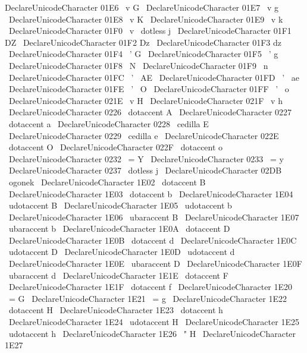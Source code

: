 {{{{{DeclareUnicodeCharacter
{
01E6
}
{
\
v
{
G
}
}
\
DeclareUnicodeCharacter
{
01E7
}
{
\
v
{
g
}
}
\
DeclareUnicodeCharacter
{
01E8
}
{
\
v
{
K
}
}
\
DeclareUnicodeCharacter
{
01E9
}
{
\
v
{
k
}
}
\
DeclareUnicodeCharacter
{
01F0
}
{
\
v
{
\
dotless
{
j
}
}
}
\
DeclareUnicodeCharacter
{
01F1
}
{
DZ
}
\
DeclareUnicodeCharacter
{
01F2
}
{
Dz
}
\
DeclareUnicodeCharacter
{
01F3
}
{
dz
}
\
DeclareUnicodeCharacter
{
01F4
}
{
\
'
G
}
\
DeclareUnicodeCharacter
{
01F5
}
{
\
'
g
}
\
DeclareUnicodeCharacter
{
01F8
}
{
\
N
}
\
DeclareUnicodeCharacter
{
01F9
}
{
\
n
}
\
DeclareUnicodeCharacter
{
01FC
}
{
\
'
{
\
AE
}
}
\
DeclareUnicodeCharacter
{
01FD
}
{
\
'
{
\
ae
}
}
\
DeclareUnicodeCharacter
{
01FE
}
{
\
'
{
\
O
}
}
\
DeclareUnicodeCharacter
{
01FF
}
{
\
'
{
\
o
}
}
\
DeclareUnicodeCharacter
{
021E
}
{
\
v
{
H
}
}
\
DeclareUnicodeCharacter
{
021F
}
{
\
v
{
h
}
}
\
DeclareUnicodeCharacter
{
0226
}
{
\
dotaccent
{
A
}
}
\
DeclareUnicodeCharacter
{
0227
}
{
\
dotaccent
{
a
}
}
\
DeclareUnicodeCharacter
{
0228
}
{
\
cedilla
{
E
}
}
\
DeclareUnicodeCharacter
{
0229
}
{
\
cedilla
{
e
}
}
\
DeclareUnicodeCharacter
{
022E
}
{
\
dotaccent
{
O
}
}
\
DeclareUnicodeCharacter
{
022F
}
{
\
dotaccent
{
o
}
}
\
DeclareUnicodeCharacter
{
0232
}
{
\
=
Y
}
\
DeclareUnicodeCharacter
{
0233
}
{
\
=
y
}
\
DeclareUnicodeCharacter
{
0237
}
{
\
dotless
{
j
}
}
\
DeclareUnicodeCharacter
{
02DB
}
{
\
ogonek
{
}
}
\
DeclareUnicodeCharacter
{
1E02
}
{
\
dotaccent
{
B
}
}
\
DeclareUnicodeCharacter
{
1E03
}
{
\
dotaccent
{
b
}
}
\
DeclareUnicodeCharacter
{
1E04
}
{
\
udotaccent
{
B
}
}
\
DeclareUnicodeCharacter
{
1E05
}
{
\
udotaccent
{
b
}
}
\
DeclareUnicodeCharacter
{
1E06
}
{
\
ubaraccent
{
B
}
}
\
DeclareUnicodeCharacter
{
1E07
}
{
\
ubaraccent
{
b
}
}
\
DeclareUnicodeCharacter
{
1E0A
}
{
\
dotaccent
{
D
}
}
\
DeclareUnicodeCharacter
{
1E0B
}
{
\
dotaccent
{
d
}
}
\
DeclareUnicodeCharacter
{
1E0C
}
{
\
udotaccent
{
D
}
}
\
DeclareUnicodeCharacter
{
1E0D
}
{
\
udotaccent
{
d
}
}
\
DeclareUnicodeCharacter
{
1E0E
}
{
\
ubaraccent
{
D
}
}
\
DeclareUnicodeCharacter
{
1E0F
}
{
\
ubaraccent
{
d
}
}
\
DeclareUnicodeCharacter
{
1E1E
}
{
\
dotaccent
{
F
}
}
\
DeclareUnicodeCharacter
{
1E1F
}
{
\
dotaccent
{
f
}
}
\
DeclareUnicodeCharacter
{
1E20
}
{
\
=
G
}
\
DeclareUnicodeCharacter
{
1E21
}
{
\
=
g
}
\
DeclareUnicodeCharacter
{
1E22
}
{
\
dotaccent
{
H
}
}
\
DeclareUnicodeCharacter
{
1E23
}
{
\
dotaccent
{
h
}
}
\
DeclareUnicodeCharacter
{
1E24
}
{
\
udotaccent
{
H
}
}
\
DeclareUnicodeCharacter
{
1E25
}
{
\
udotaccent
{
h
}
}
\
DeclareUnicodeCharacter
{
1E26
}
{
\
"
H
}
\
DeclareUnicodeCharacter
{
1E27
}}}}}}
